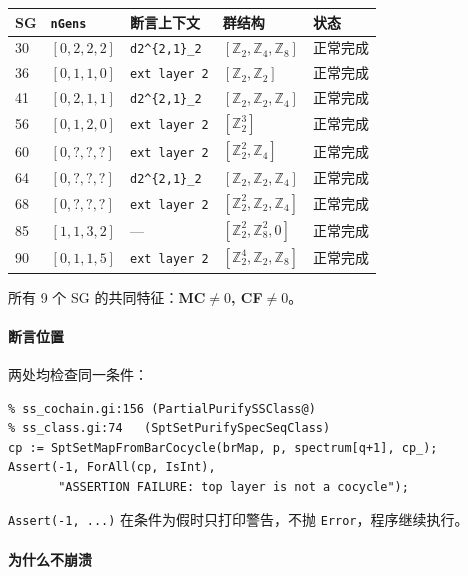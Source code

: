 \documentclass[a4paper,fontset=ubuntu,12pt]{ctexart}
\begin{document}
\begin{center}
\begin{tabular}{lllll}
\hline
SG & \texttt{nGens} & 断言上下文 & 群结构 & 状态 \\
\hline
30 & $[0,2,2,2]$ & \texttt{d2\^{}\{2,1\}\_2} & $[\mathbb{Z}_2,\mathbb{Z}_4,\mathbb{Z}_8]$ & 正常完成 \\
36 & $[0,1,1,0]$ & \texttt{ext layer 2} & $[\mathbb{Z}_2,\mathbb{Z}_2]$ & 正常完成 \\
41 & $[0,2,1,1]$ & \texttt{d2\^{}\{2,1\}\_2} & $[\mathbb{Z}_2,\mathbb{Z}_2,\mathbb{Z}_4]$ & 正常完成 \\
56 & $[0,1,2,0]$ & \texttt{ext layer 2} & $[\mathbb{Z}_2^3]$ & 正常完成 \\
60 & $[0,?,?,?]$ & \texttt{ext layer 2} & $[\mathbb{Z}_2^2,\mathbb{Z}_4]$ & 正常完成 \\
64 & $[0,?,?,?]$ & \texttt{d2\^{}\{2,1\}\_2} & $[\mathbb{Z}_2,\mathbb{Z}_2,\mathbb{Z}_4]$ & 正常完成 \\
68 & $[0,?,?,?]$ & \texttt{ext layer 2} & $[\mathbb{Z}_2^2,\mathbb{Z}_2,\mathbb{Z}_4]$ & 正常完成 \\
85 & $[1,1,3,2]$ & — & $[\mathbb{Z}_2^2,\mathbb{Z}_8^2,0]$ & 正常完成 \\
90 & $[0,1,1,5]$ & \texttt{ext layer 2} & $[\mathbb{Z}_2^4,\mathbb{Z}_2,\mathbb{Z}_8]$ & 正常完成 \\
\hline
\end{tabular}
\end{center}

所有 9 个 SG 的共同特征：\textbf{MC$\neq 0$, CF$\neq 0$}。

\paragraph{断言位置}

两处均检查同一条件：

\begin{verbatim}
% ss_cochain.gi:156 (PartialPurifySSClass@)
% ss_class.gi:74   (SptSetPurifySpecSeqClass)
cp := SptSetMapFromBarCocycle(brMap, p, spectrum[q+1], cp_);
Assert(-1, ForAll(cp, IsInt),
       "ASSERTION FAILURE: top layer is not a cocycle");
\end{verbatim}

\texttt{Assert(-1, ...)} 在条件为假时只打印警告，不抛 \texttt{Error}，程序继续执行。

\paragraph{为什么不崩溃}
\end{document}
